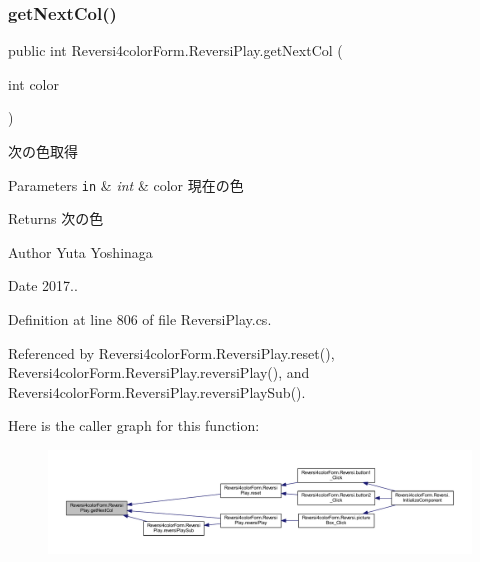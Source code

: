 \subsubsection{\texorpdfstring{get\+Next\+Col()}{getNextCol()}}
{\footnotesize\ttfamily public int Reversi4color\+Form.\+Reversi\+Play.\+get\+Next\+Col (\begin{DoxyParamCaption}\item[{int}]{color }\end{DoxyParamCaption})}



次の色取得 


\begin{DoxyParams}[1]{Parameters}
\mbox{\tt in}  & {\em int} & color 現在の色 \\
\hline
\end{DoxyParams}
\begin{DoxyReturn}{Returns}
次の色 
\end{DoxyReturn}
\begin{DoxyAuthor}{Author}
Yuta Yoshinaga 
\end{DoxyAuthor}
\begin{DoxyDate}{Date}
2017.. 
\end{DoxyDate}


Definition at line 806 of file Reversi\+Play.\+cs.



Referenced by Reversi4color\+Form.\+Reversi\+Play.\+reset(), Reversi4color\+Form.\+Reversi\+Play.\+reversi\+Play(), and Reversi4color\+Form.\+Reversi\+Play.\+reversi\+Play\+Sub().

Here is the caller graph for this function\+:
\nopagebreak
\begin{figure}[H]
\begin{center}
\leavevmode
\includegraphics[width=350pt]{class_reversi4color_form_1_1_reversi_play_a037f282ad4aeb2807a0108cbbb82fd02_icgraph}
\end{center}
\end{figure}
\mbox{\label{class_reversi4color_form_1_1_reversi_play_a32c01f1f57a7413cd5173637800f74b7}} 
